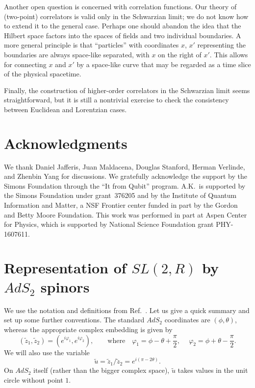 \documentclass[11pt]{article}
\newcommand{\vp}{\varphi}
\newcommand{\RR}{\mathbb{R}}
\DeclareMathOperator{\SL}{SL}
\DeclareMathOperator{\AdS}{AdS}
\newcommand{\tu}{\tilde{u}}
\newcommand{\tz}{\tilde{z}}
\def\widetilde#1{#1}%
\def\AdS{AdS}
\def\SL{SL}
\def\RR{R}
\begin{document}
Another open question is concerned with correlation functions. Our theory of (two-point) correlators is valid only in the Schwarzian limit; we do not know how to extend it to the general case. Perhaps one should abandon the idea that the Hilbert space factors into the spaces of fields and two individual boundaries. A more general principle is that ``particles'' with coordinates $x$, $x'$ representing the boundaries are always space-like separated, with $x$ on the right of $x'$. This allows for connecting $x$ and $x'$ by a space-like curve that may be regarded as a time slice of the physical spacetime. 

Finally, the construction of higher-order correlators in the Schwarzian limit seems straightforward, but it is still a nontrivial exercise to check the consistency between Euclidean and Lorentzian cases.


\section*{Acknowledgments}
We thank Daniel Jafferis, Juan Maldacena, Douglas Stanford, Herman Verlinde, and Zhenbin Yang for discussions. We gratefully acknowledge the support by the Simons Foundation through the ``It from Qubit'' program. A.K.\ is supported by the Simons Foundation under grant~376205 and by the Institute of Quantum Information and Matter, a NSF Frontier center funded in part by the Gordon and Betty Moore Foundation. This work was performed in part at Aspen Center for Physics, which is supported by National Science Foundation grant PHY-1607611.

\appendix

\section{Representation of $\widetilde{\SL}(2,\RR)$ by $\widetilde{\AdS}_2$ spinors} \label{app:repth}

We use the notation and definitions from Ref.~\cite{SL2R}. Let us give a quick summary and set up some further conventions. The standard $\widetilde{\AdS}_2$ coordinates are $(\phi,\theta)$, whereas the appropriate complex embedding is given by
\begin{equation}\label{vp1vp2}
(\tz_1,\tz_2)=(e^{i\vp_1},e^{i\vp_2}),\qquad \text{where}\quad \vp_1=\phi-\theta+\frac{\pi}{2},\quad\: \vp_2=\phi+\theta-\frac{\pi}{2}.
\end{equation}
We will also use the variable
\begin{equation}
\tu=\tz_1/\tz_2=e^{i(\pi-2\theta)}.
\end{equation}
On $\widetilde{\AdS}_2$ itself (rather than the bigger complex space), $\tu$ takes values in the unit circle without point $1$.
\end{document}

